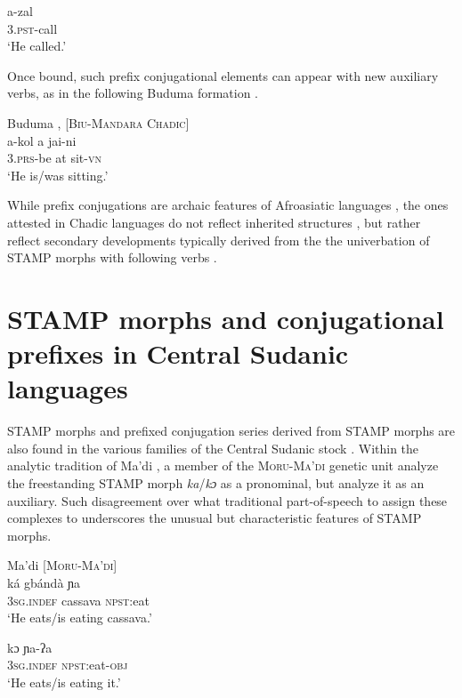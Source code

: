 \documentclass[output=paper]{langsci/langscibook}
\begin{document}
\ex \label{ex:anderson:45b}
\gll a-zal\\
  3\textsc{.pst}-call\\
\glt `He called.'
\z
\z

Once bound, such prefix conjugational elements can appear with new auxiliary verbs, as in the following Buduma formation .

\ea\label{ex:anderson:46}
Buduma \citep[376]{Pawlak2001}, \citep[55]{Lukas1939}    [\textsc{Biu-Mandara Chadic}]\\
\gll a-kol  a  jai-ni\\
\textsc{3.prs}-be  at  sit\textsc{-vn}\\
\glt `He is/was sitting.' 
\z

While prefix conjugations are archaic features of Afroasiatic languages \citep{Hodge1971, Schuh1976, Mukarovsky1983, Voigt1987}, the ones attested in Chadic languages do not reflect inherited structures \citep{Schuh1976, Voigt1989, Jungraithmayr2005, Jungraithmayr2006}, but rather reflect secondary developments typically derived from the the univerbation of STAMP morphs with following verbs \citep{Caron2006, Shay2008, Anderson2011, Anderson2012}.

\section{STAMP morphs and conjugational prefixes in Central Sudanic languages}\label{sec:Anderson:8}

STAMP morphs and prefixed conjugation series derived from STAMP morphs are also found in the various families of the Central Sudanic stock \citep{Anderson2015}. Within the analytic tradition of Ma'di , a member of the \textsc{Moru-Ma'di} genetic unit \citet{BlackingsFabb2003} analyze the freestanding STAMP morph \textit{ka}/\textit{kɔ} as a pronominal, but \citet{TuckerBryan1966} analyze it as an auxiliary. Such disagreement over what traditional part-of-speech to assign these complexes to underscores the unusual but characteristic features of STAMP morphs. 

\ea\label{ex:anderson:47}
Ma'di \citep[13]{BlackingsFabb2003}      [\textsc{Moru-Ma'di}]\\
\ea\label{ex:anderson:47a}
\gll ká    gbándà  {\textasciigrave}ɲa  \\
  \textsc{3sg.indef}  cassava  \textsc{npst}:eat\\
\glt `He eats/is eating cassava.'      

\ex\label{ex:anderson:47b}
\gll kɔ    {\textasciigrave}ɲa-ʔa\\
  3\textsc{sg.indef}  \textsc{npst}:eat-\textsc{obj}\\
\glt `He eats/is eating it.'
\z
\z
\end{document}
